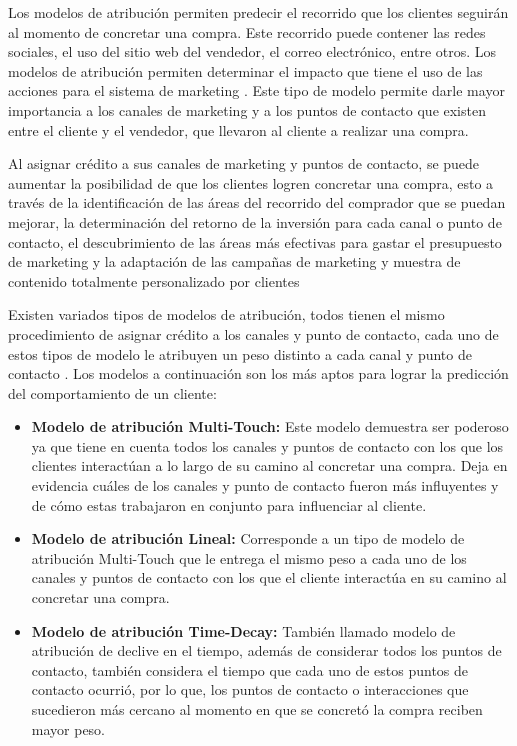 Los modelos de atribución permiten predecir el recorrido que los clientes seguirán al momento de concretar una compra. Este recorrido puede contener las redes sociales, el uso del sitio web del vendedor, el correo electrónico, entre otros. Los modelos de atribución permiten determinar el impacto que tiene el uso de las acciones para el sistema de marketing \cite{modelo-atribucion}. Este tipo de modelo permite darle mayor importancia a los canales de marketing y a los puntos de contacto que existen entre el cliente y el vendedor, que llevaron al cliente a realizar una compra.

Al asignar crédito a sus canales de marketing y puntos de contacto, se puede aumentar la posibilidad de que los clientes logren concretar una compra, esto a través de la identificación de las áreas del recorrido del comprador que se puedan mejorar, la determinación del retorno de la inversión para cada canal o punto de contacto, el descubrimiento de las áreas más efectivas para gastar el presupuesto de marketing y la adaptación de las campañas de marketing y muestra de contenido totalmente personalizado por clientes \cite{modelo-atribucion}

Existen variados tipos de modelos de atribución, todos tienen el mismo procedimiento de asignar crédito a los canales y punto de contacto, cada uno de estos tipos de modelo le atribuyen un peso distinto a cada canal y punto de contacto \cite{modelo-atribucion}. Los modelos a continuación son los más aptos para lograr la predicción del comportamiento de un cliente:

\begin{itemize}
    \item \textbf{Modelo de atribución Multi-Touch:} Este modelo demuestra ser poderoso ya que tiene en cuenta todos los canales y puntos de contacto con los que los clientes interactúan a lo largo de su camino al concretar una compra. Deja en evidencia cuáles de los canales y punto de contacto fueron más influyentes y de cómo estas trabajaron en conjunto para influenciar al cliente.
    \item \textbf{Modelo de atribución Lineal:} Corresponde a un tipo de modelo de atribución Multi-Touch que le entrega el mismo peso a cada uno de los canales y puntos de contacto con los que el cliente interactúa en su camino al concretar una compra.
    \item \textbf{Modelo de atribución Time-Decay:} También llamado modelo de atribución de declive en el tiempo, además de considerar todos los puntos de contacto, también considera el tiempo que cada uno de estos puntos de contacto ocurrió, por lo que, los puntos de contacto o interacciones que sucedieron más cercano al momento en que se concretó la compra reciben mayor peso.
\end{itemize}

